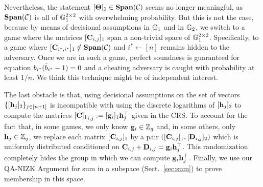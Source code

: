 Nevertheless, the statement $[\mathbf{{\Theta}}]_1\in\mathbf{Span}(\mathcal{C})$ seems no longer meaningful, as $\mathbf{Span}(\mathcal{C})$ is all of $\mathbb{G}_1^{2\times 2}$ with overwhelming probability. But this is not the case, because by means of decisional assumptions in $\mathbb{G}_1$ and in $\mathbb{G}_2$, we switch to a game where the matrices
$[\mathbf{{C}}_{i,j}]_1$ span a non-trivial space of $\mathbb{G}_1^{2 \times 2}$. Specifically, to a game where $[\mathbf{{C}}_{i^*,i^*}]_1\notin\mathbf{Span}(\mathcal{C})$ and $i^*\gets[n]$ remains hidden to the adversary. Once we are in such a game, perfect soundness is guaranteed for equation $b_{i^*}(\bar{b}_{i^*}-1)=0$ and a cheating adversary is caught with probability at least $1/n$. We think this technique might be of independent interest.

The last obstacle is that, 
  using decisional assumptions on the set of vectors 
  $\{[\mathbf{h}_{j}]_2\}_{j\in[n+1]}$ is incompatible with using the discrete logarithms of $[\mathbf{h}_j]_2$ to compute the matrices ${[\mathbf{{C}}]_1}_{i,j}:=[\mathbf{g}_i]_1 \mathbf{h}_j^{\top}$ given in the CRS. 
To account for the fact that, in some games,
  we only know $\mathbf{g}_i \in \mathbb{Z}_q$ and, in some others,
  only $\mathbf{h}_j \in \mathbb{Z}_q$, we replace each matrix 
  $[\mathbf{{C}}_{i,j}]_1$ by a pair 
  $([\mathbf{{C}}_{i,j}]_1,[\mathbf{{D}}_{i,j}]_2)$ which is uniformly 
  distributed conditioned on 
  $\mathbf{{C}}_{i,j}+\mathbf{{D}}_{i,j}=\mathbf{g}_i \mathbf{h}_j^{\top}$.
This randomization completely hides the group in which we can compute 
  $\mathbf{g}_i \mathbf{h}_j^{\top}$. 
  Finally, we use our QA-NIZK Argument for sum in a subspace (Sect.\ \ref{sec:sum}) to prove membership in this space.

